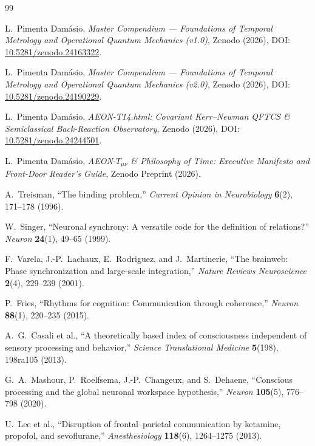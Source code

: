 \documentclass[11pt,a4paper]{article}
\begin{document}
\begin{thebibliography}{99}

L.~Pimenta Damásio, \emph{Master Compendium — Foundations of Temporal Metrology and Operational Quantum Mechanics (v1.0)}, Zenodo (2026), DOI: \href{https://doi.org/10.5281/zenodo.24163322}{10.5281/zenodo.24163322}.

L.~Pimenta Damásio, \emph{Master Compendium — Foundations of Temporal Metrology and Operational Quantum Mechanics (v2.0)}, Zenodo (2026), DOI: \href{https://doi.org/10.5281/zenodo.24190229}{10.5281/zenodo.24190229}.

L.~Pimenta Damásio, \emph{AEON-T14.html: Covariant Kerr--Newman QFTCS \& Semiclassical Back-Reaction Observatory}, Zenodo (2026), DOI: \href{https://doi.org/10.5281/zenodo.24244501}{10.5281/zenodo.24244501}.

L.~Pimenta Damásio, \emph{AEON-$T_{\mu\nu}$ \& Philosophy of Time: Executive Manifesto and Front-Door Reader's Guide}, Zenodo Preprint (2026).

A.~Treisman, ``The binding problem,'' \emph{Current Opinion in Neurobiology} \textbf{6}(2), 171--178 (1996).

W.~Singer, ``Neuronal synchrony: A versatile code for the definition of relations?'' \emph{Neuron} \textbf{24}(1), 49--65 (1999).

F.~Varela, J.-P.~Lachaux, E.~Rodriguez, and J.~Martinerie, ``The brainweb: Phase synchronization and large-scale integration,'' \emph{Nature Reviews Neuroscience} \textbf{2}(4), 229--239 (2001).

P.~Fries, ``Rhythms for cognition: Communication through coherence,'' \emph{Neuron} \textbf{88}(1), 220--235 (2015).

A.~G.~Casali et al., ``A theoretically based index of consciousness independent of sensory processing and behavior,'' \emph{Science Translational Medicine} \textbf{5}(198), 198ra105 (2013).

G.~A.~Mashour, P.~Roelfsema, J.-P.~Changeux, and S.~Dehaene, ``Conscious processing and the global neuronal workspace hypothesis,'' \emph{Neuron} \textbf{105}(5), 776--798 (2020).

U.~Lee et al., ``Disruption of frontal--parietal communication by ketamine, propofol, and sevoflurane,'' \emph{Anesthesiology} \textbf{118}(6), 1264--1275 (2013).


\end{thebibliography}
\end{document}
